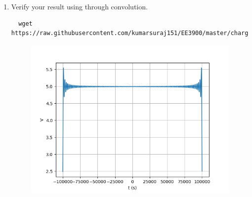 \documentclass[journal,12pt,twocolumn]{IEEEtran}
\renewcommand\thesection{\arabic{section}}
\begin{document}
\begin{enumerate}[label=\thesection.\arabic*
,ref=\thesection.\theenumi]
\begin{align}
h(t)=\frac{2V_0\pi f_0}{A_0}\sinc{4f_0t}
\end{align}
\item Verify your result using  through convolution.
\solution 
\begin{lstlisting}
  wget https://raw.githubusercontent.com/kumarsuraj151/EE3900/master/charger/codes/4.3.py
\end{lstlisting}
\begin{figure}[!ht]
  \centering
  \includegraphics[width=\columnwidth]{./figs/4.3.png  }
  \caption{}
\end{figure}
\end{enumerate}
\end{document}
